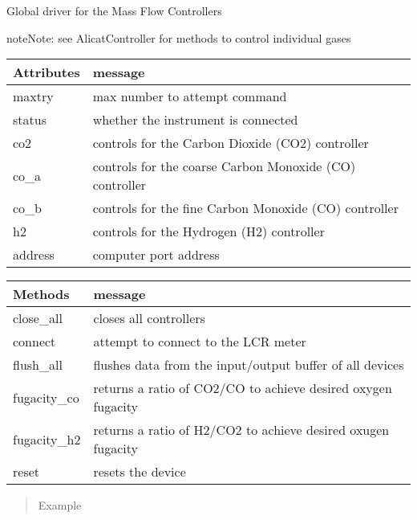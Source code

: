 \documentclass[letterpaper,10pt,english]{sphinxmanual}
\begin{document}
\begin{fulllineitems}
\label{\detokenize{drivers:drivers.MFC}}
Global driver for the Mass Flow Controllers

\begin{sphinxadmonition}{note}{Note:}
see AlicatController for methods to control individual gases
\end{sphinxadmonition}


\begin{savenotes}\sphinxattablestart
\centering
\begin{tabulary}{\linewidth}[t]{|T|T|}
\hline
\sphinxstyletheadfamily 
Attributes
&\sphinxstyletheadfamily 
message
\\
\hline
maxtry
&
max number to attempt command
\\
\hline
status
&
whether the instrument is connected
\\
\hline
co2
&
controls for the Carbon Dioxide (CO2) controller
\\
\hline
co\_a
&
controls for the coarse Carbon Monoxide (CO) controller
\\
\hline
co\_b
&
controls for the fine Carbon Monoxide (CO) controller
\\
\hline
h2
&
controls for the Hydrogen (H2) controller
\\
\hline
address
&
computer port address
\\
\hline
\end{tabulary}
\par
\sphinxattableend\end{savenotes}


\begin{savenotes}\sphinxattablestart
\centering
\begin{tabulary}{\linewidth}[t]{|T|T|}
\hline
\sphinxstyletheadfamily 
Methods
&\sphinxstyletheadfamily 
message
\\
\hline
close\_all
&
closes all controllers
\\
\hline
connect
&
attempt to connect to the LCR meter
\\
\hline
flush\_all
&
flushes data from the input/output buffer of all devices
\\
\hline
fugacity\_co
&
returns a ratio of CO2/CO to achieve desired oxygen fugacity
\\
\hline
fugacity\_h2
&
returns a ratio of H2/CO2 to achieve desired oxugen fugacity
\\
\hline
reset
&
resets the device
\\
\hline
\end{tabulary}
\par
\sphinxattableend\end{savenotes}
\begin{quote}\begin{description}
\item[{Example}] \leavevmode
\end{description}\end{quote}


\end{fulllineitems}
\end{document}
